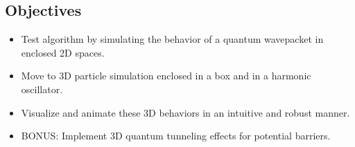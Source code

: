 \documentclass[11pt, letterpaper]{article}
\begin{document}
\subsection*{Objectives}

\begin{itemize}[noitemsep, topsep=0pt, parsep=0pt, partopsep=0pt]
\item Test algorithm by simulating the behavior of a quantum wavepacket in enclosed 2D spaces.
\item Move to 3D particle simulation enclosed in a box and in a harmonic oscillator.
\item Visualize and animate these 3D behaviors in an intuitive and robust manner.
\item BONUS: Implement 3D quantum tunneling effects for potential barriers.
\end{itemize}
\end{document}
